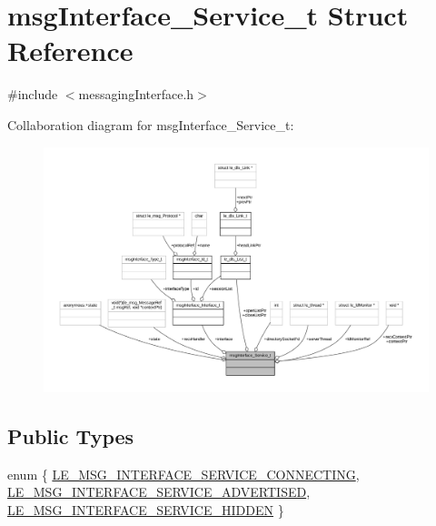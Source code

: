 \hypertarget{structmsg_interface___service__t}{}\section{msg\+Interface\+\_\+\+Service\+\_\+t Struct Reference}
\label{structmsg_interface___service__t}


{\ttfamily \#include $<$messaging\+Interface.\+h$>$}



Collaboration diagram for msg\+Interface\+\_\+\+Service\+\_\+t\+:
\nopagebreak
\begin{figure}[H]
\begin{center}
\leavevmode
\includegraphics[width=350pt]{structmsg_interface___service__t__coll__graph}
\end{center}
\end{figure}
\subsection*{Public Types}
\begin{DoxyCompactItemize}
\item 
enum \{ \hyperlink{structmsg_interface___service__t_a81f0570708fc39caf16b806f3ad32e21a70891989544b136d1e97b84d4f3b8cce}{L\+E\+\_\+\+M\+S\+G\+\_\+\+I\+N\+T\+E\+R\+F\+A\+C\+E\+\_\+\+S\+E\+R\+V\+I\+C\+E\+\_\+\+C\+O\+N\+N\+E\+C\+T\+I\+NG}, 
\hyperlink{structmsg_interface___service__t_a81f0570708fc39caf16b806f3ad32e21a9d6e294e317aee8833cd1050113b35e0}{L\+E\+\_\+\+M\+S\+G\+\_\+\+I\+N\+T\+E\+R\+F\+A\+C\+E\+\_\+\+S\+E\+R\+V\+I\+C\+E\+\_\+\+A\+D\+V\+E\+R\+T\+I\+S\+ED}, 
\hyperlink{structmsg_interface___service__t_a81f0570708fc39caf16b806f3ad32e21a486692d12634da37cfd95b56626bfe17}{L\+E\+\_\+\+M\+S\+G\+\_\+\+I\+N\+T\+E\+R\+F\+A\+C\+E\+\_\+\+S\+E\+R\+V\+I\+C\+E\+\_\+\+H\+I\+D\+D\+EN}
 \}
\end{DoxyCompactItemize}
